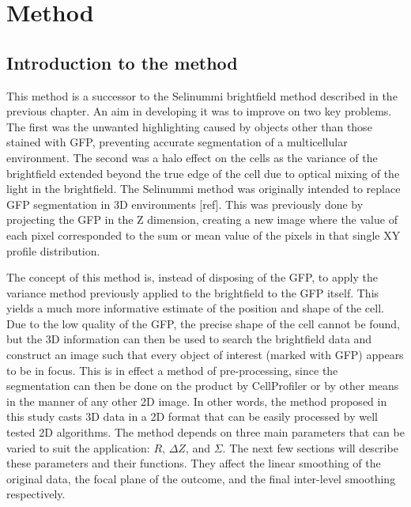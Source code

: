 
\chapter{Method}

\ifpdf
    \graphicspath{{Chapter4/Figs/Raster/}{Chapter4/Figs/PDF/}{Chapter4/Figs/}}
\else
    \graphicspath{{Chapter4/Figs/Vector/}{Chapter4/Figs/}}
\fi

\section{Introduction to the method}

This method is a successor to the Selinummi brightfield method described in the previous chapter. An aim in developing it was to improve on two key problems. The first was the unwanted highlighting caused by objects other than those stained with GFP, preventing accurate segmentation of a multicellular environment. The second was a halo effect on the cells as the variance of the brightfield extended beyond the true edge of the cell due to optical mixing of the light in the brightfield. The Selinummi method was originally intended to replace GFP segmentation in 3D environments [ref]. This was previously done by projecting the GFP in the Z dimension, creating a new image where the value of each pixel corresponded to the sum or mean value of the pixels in that single XY profile distribution.

The concept of this method is, instead of disposing of the GFP, to apply the variance method previously applied to the brightfield to the GFP itself. This yields a much more informative estimate of the position and shape of the cell. Due to the low quality of the GFP, the precise shape of the cell cannot be found, but the 3D information can then be used to search the brightfield data and construct an image such that every object of interest (marked with GFP) appears to be in focus. This is in effect a method of pre-processing, since the segmentation can then be done on the product by CellProfiler or by other means in the manner of any other 2D image. In other words, the method proposed in this study casts 3D data in a 2D format that can be easily processed by well tested 2D algorithms. The method depends on three main parameters that can be varied to suit the application: $R$, $\Delta Z$, and $\Sigma$. The next few sections will describe these parameters and their functions. They affect the linear smoothing of the original data, the focal plane of the outcome, and the final inter-level smoothing respectively.

